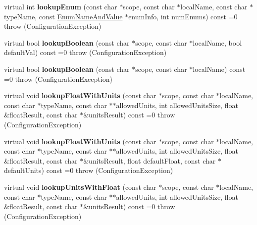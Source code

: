 \begin{DoxyCompactItemize}
\item 
\hypertarget{classCONFIG4CPP__NAMESPACE_1_1Configuration_a604084c81180661f830c4da1c0fe9366}{virtual int {\bfseries lookup\-Enum} (const char $\ast$scope, const char $\ast$local\-Name, const char $\ast$type\-Name, const \hyperlink{structCONFIG4CPP__NAMESPACE_1_1EnumNameAndValue}{Enum\-Name\-And\-Value} $\ast$enum\-Info, int num\-Enums) const =0  throw (\-Configuration\-Exception)}\label{classCONFIG4CPP__NAMESPACE_1_1Configuration_a604084c81180661f830c4da1c0fe9366}

\item 
\hypertarget{classCONFIG4CPP__NAMESPACE_1_1Configuration_a292fcba7dc020393a230a1190e551184}{virtual bool {\bfseries lookup\-Boolean} (const char $\ast$scope, const char $\ast$local\-Name, bool default\-Val) const =0  throw (\-Configuration\-Exception)}\label{classCONFIG4CPP__NAMESPACE_1_1Configuration_a292fcba7dc020393a230a1190e551184}

\item 
\hypertarget{classCONFIG4CPP__NAMESPACE_1_1Configuration_aeef7e63e598546b9713ee1a2b9517b9e}{virtual bool {\bfseries lookup\-Boolean} (const char $\ast$scope, const char $\ast$local\-Name) const =0  throw (\-Configuration\-Exception)}\label{classCONFIG4CPP__NAMESPACE_1_1Configuration_aeef7e63e598546b9713ee1a2b9517b9e}

\item 
\hypertarget{classCONFIG4CPP__NAMESPACE_1_1Configuration_a06356d620f19cc192b43c5663fe2e73f}{virtual void {\bfseries lookup\-Float\-With\-Units} (const char $\ast$scope, const char $\ast$local\-Name, const char $\ast$type\-Name, const char $\ast$$\ast$allowed\-Units, int allowed\-Units\-Size, float \&float\-Result, const char $\ast$\&units\-Result) const =0  throw (\-Configuration\-Exception)}\label{classCONFIG4CPP__NAMESPACE_1_1Configuration_a06356d620f19cc192b43c5663fe2e73f}

\item 
\hypertarget{classCONFIG4CPP__NAMESPACE_1_1Configuration_a1c9cae8721b367b5181f95091a0d9f77}{virtual void {\bfseries lookup\-Float\-With\-Units} (const char $\ast$scope, const char $\ast$local\-Name, const char $\ast$type\-Name, const char $\ast$$\ast$allowed\-Units, int allowed\-Units\-Size, float \&float\-Result, const char $\ast$\&units\-Result, float default\-Float, const char $\ast$default\-Units) const =0  throw (\-Configuration\-Exception)}\label{classCONFIG4CPP__NAMESPACE_1_1Configuration_a1c9cae8721b367b5181f95091a0d9f77}

\item 
\hypertarget{classCONFIG4CPP__NAMESPACE_1_1Configuration_a604b3d82b8e688f8f97326ef86afa763}{virtual void {\bfseries lookup\-Units\-With\-Float} (const char $\ast$scope, const char $\ast$local\-Name, const char $\ast$type\-Name, const char $\ast$$\ast$allowed\-Units, int allowed\-Units\-Size, float \&float\-Result, const char $\ast$\&units\-Result) const =0  throw (\-Configuration\-Exception)}\label{classCONFIG4CPP__NAMESPACE_1_1Configuration_a604b3d82b8e688f8f97326ef86afa763}


\end{DoxyCompactItemize}

